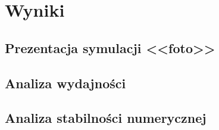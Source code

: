 \newpage

\section{Wyniki}

\paragraph{}

\par

\subsection{Prezentacja symulacji <<foto>>}

\paragraph{}

\par

\subsection{Analiza wydajności}

\paragraph{}

\par

\subsection{Analiza stabilności numerycznej}

\paragraph{}

\par